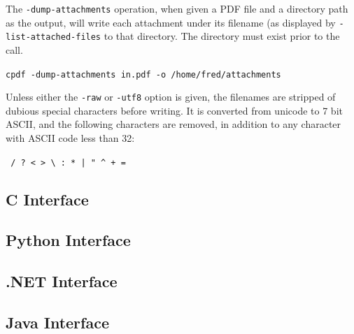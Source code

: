 \documentclass{book}
\begin{document}
The \texttt{-dump-attachments} operation, when given a PDF file and a directory path as the output, will write each attachment under its filename (as displayed by \texttt{-list-attached-files} to that directory. The directory must exist prior to the call.

  \begin{framed}
    \noindent\small\verb!cpdf -dump-attachments in.pdf -o /home/fred/attachments!
  \end{framed}

\noindent  Unless either the \texttt{-raw} or \texttt{-utf8} option is given, the filenames are stripped of dubious special characters before writing. It is converted from unicode to 7 bit ASCII, and the following characters are removed, in addition to any character with ASCII code less than 32:

  \begin{framed}
  \centering
  \verb! / ? < > \ : * | " ^ + =!
  \end{framed}


\begin{cpdflib}
\clearpage
\section*{C Interface}
\begin{small}\tt

\end{small}
\end{cpdflib}

\begin{pycpdflib}
\clearpage
\section*{Python Interface}
\begin{small}\tt

\end{small}
\end{pycpdflib}

\begin{dotnetcpdflib}
\clearpage
\section*{.NET Interface}
\begin{small}\tt

\end{small}
\end{dotnetcpdflib}

\begin{jcpdflib}
\clearpage
\section*{Java Interface}
\begin{small}\tt

\end{small}
\end{jcpdflib}
\end{document}
